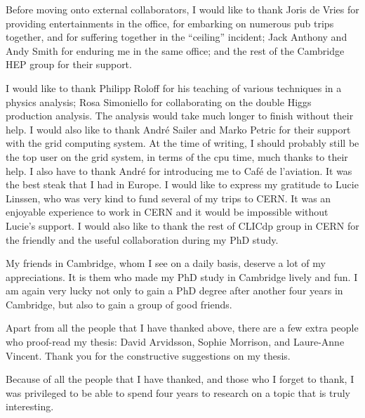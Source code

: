 \begin{acknowledgements}

Before moving onto external collaborators, I would like to thank Joris de Vries for providing entertainments in the office, for embarking on numerous pub trips together, and for suffering together in the ``ceiling'' incident; Jack Anthony and Andy Smith for enduring me in the same office; and the rest of the Cambridge HEP group for their support.

I would like to thank Philipp Roloff for his teaching of various techniques in a physics analysis; Rosa Simoniello for collaborating on the double Higgs production analysis. The analysis would take much longer to finish without their help. I would also like to thank Andr\'{e} Sailer and Marko Petric for their support with the \CLIC grid computing system. At the time of writing, I should probably still be the top user on the grid system, in terms of the cpu time, much thanks to their help. I also have to thank Andr\'{e} for introducing me to Caf\'{e} de l'aviation. It was the best steak that I had in Europe. I would like to express my gratitude to Lucie Linssen, who was very kind to fund several of my trips to CERN. It was an enjoyable experience to work in CERN and it would be impossible without Lucie's support. I would also like to thank the rest of CLICdp group in CERN for the friendly and the useful collaboration during my PhD study.

My friends in Cambridge, whom I see on a daily basis, deserve a lot of my appreciations. It is them who made my PhD study in Cambridge lively and fun. I am again very lucky not only to gain a PhD degree  after another four years in Cambridge, but also to gain a group of good friends.

Apart from all the people that I have thanked above, there are a few extra people who proof-read my thesis: David Arvidsson, Sophie Morrison, and Laure-Anne Vincent. Thank you for the constructive suggestions on my thesis.

Because of all the people that I have thanked, and those who I forget to thank, I was privileged to be able to spend four years to research on a topic that is truly interesting.


\end{acknowledgements}



